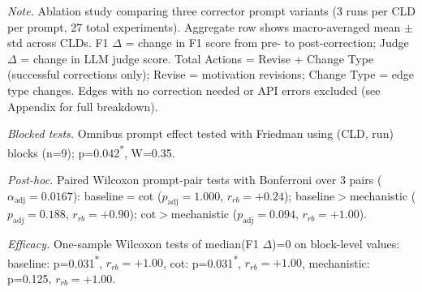 \begin{table}[H]
\centering
\begin{minipage}{\linewidth}
\centering
\caption{Corrector Prompt Ablation on Synthetic Corruptions: Performance Comparison}
\label{tab:rq1b_prompt_ablation_synthetic}
\begin{threeparttable}
\end{threeparttable}
\vspace{0.5em}
\footnotesize
\textit{Note.} Ablation study comparing three corrector prompt variants (3 runs per CLD per prompt, 27 total experiments). 
Aggregate row shows macro-averaged mean $\pm$ std across CLDs.
F1 $\Delta$ = change in F1 score from pre- to post-correction; Judge $\Delta$ = change in LLM judge score.
Total Actions = Revise + Change Type (successful corrections only); Revise = motivation revisions; Change Type = edge type changes.
Edges with no correction needed or API errors excluded (see Appendix for full breakdown).\par
\textit{Blocked tests.} Omnibus prompt effect tested with Friedman using (CLD, run) blocks (n=9); p=0.042\textsuperscript{*}, W=0.35.\par
\textit{Post-hoc.} Paired Wilcoxon prompt-pair tests with Bonferroni over 3 pairs ($\alpha_{\text{adj}}=0.0167$): baseline$=$cot ($p_{\text{adj}}=1.000$, $r_{rb}=+0.24$); baseline$>$mechanistic ($p_{\text{adj}}=0.188$, $r_{rb}=+0.90$); cot$>$mechanistic ($p_{\text{adj}}=0.094$, $r_{rb}=+1.00$).\par
\textit{Efficacy.} One-sample Wilcoxon tests of median(F1 $\Delta$)=0 on block-level values: baseline: p=0.031\textsuperscript{*}, $r_{rb}=+1.00$, cot: p=0.031\textsuperscript{*}, $r_{rb}=+1.00$, mechanistic: p=0.125, $r_{rb}=+1.00$.

\end{minipage}
\end{table}
